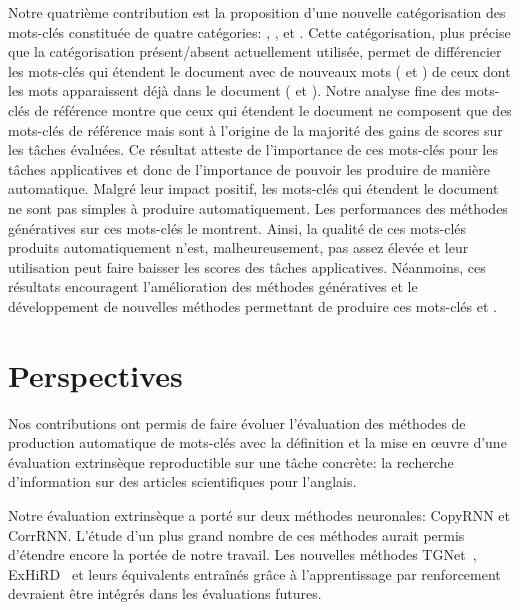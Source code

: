 Notre quatrième contribution est la proposition d'une nouvelle catégorisation des mots-clés constituée de quatre catégories: \present{}, \reordonne{}, \mixte{} et \nonvu{}.
Cette catégorisation, plus précise que la catégorisation présent/absent actuellement utilisée, permet de différencier les mots-clés qui étendent le document avec de nouveaux mots (\mixte{} et \nonvu{}) de ceux dont les mots apparaissent déjà dans le document (\presents{} et \reordonne{}).
Notre analyse fine des mots-clés de référence montre que ceux qui étendent le document ne composent que  des mots-clés de référence mais sont à l'origine de la majorité des gains de scores sur les tâches évaluées.
Ce résultat atteste de l'importance de ces mots-clés pour les tâches applicatives et donc de l'importance de pouvoir les produire de manière automatique.
Malgré leur impact positif, les mots-clés qui étendent le document ne sont pas simples à produire automatiquement. Les performances des méthodes génératives sur ces mots-clés le montrent.
Ainsi, la qualité de ces mots-clés produits automatiquement n'est, malheureusement, pas assez élevée et leur utilisation peut faire baisser les scores des tâches applicatives. Néanmoins, ces résultats encouragent l'amélioration des méthodes génératives et le développement de nouvelles méthodes permettant de produire ces mots-clés \mixtes{} et \nonvus{}.

\section{Perspectives}

Nos contributions ont permis de faire évoluer l'évaluation des méthodes de production automatique de mots-clés avec la définition et la mise en \oe{}uvre d'une évaluation extrinsèque reproductible sur une tâche concrète: la recherche d'information sur des articles scientifiques pour l'anglais.

Notre évaluation extrinsèque a porté sur deux méthodes neuronales: CopyRNN et CorrRNN.
L'étude d'un plus grand nombre de ces méthodes aurait permis d'étendre encore la portée de notre travail. Les nouvelles méthodes TGNet~\cite{chen_title-guided_2019}, ExHiRD~\cite{chen_exclusive_2020} et leurs équivalents entraînés grâce à l'apprentissage par renforcement~\cite{chan_neural_2019} devraient être intégrés dans les évaluations futures.

